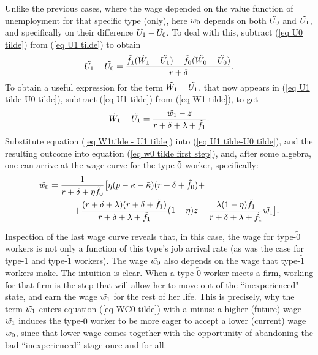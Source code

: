 \documentclass[12pt]{article} %
\theoremstyle{definition}
\begin{document}
Unlike the previous cases, where the wage depended on the value function of unemployment for that specific type (only), here $\Tilde{w_0}$ depends on both $\Tilde{U_0}$ {and} $\Tilde{U_1}$, and specifically on their difference $\Tilde{U_1}-\Tilde{U_0}$. To deal with this, subtract (\ref{eq U0 tilde}) from (\ref{eq U1 tilde}) to obtain 
\begin{equation}
\Tilde{U_1}-\Tilde{U_0} = \frac{\Tilde{f_1}(\Tilde{W_1}-\Tilde{U_1}) - \Tilde{f_0}(\Tilde{W_0}-\Tilde{U_0})}{r+\delta}.\label{eq U1 tilde-U0 tilde}
    \end{equation}To obtain a useful expression for the term $\Tilde{W_1}-\Tilde{U_1}$, that now appears in (\ref{eq U1 tilde-U0 tilde}), subtract (\ref{eq U1 tilde}) from (\ref{eq W1 tilde}), to get  
\begin{equation}
\Tilde{W_1}-\Tilde{U_1} = \frac{\Tilde{w_1}-z}{r+\delta+\lambda+\Tilde{f_1}}. \label{eq W1tilde - U1 tilde}
\end{equation} Substitute equation (\ref{eq W1tilde - U1 tilde}) into (\ref{eq U1 tilde-U0 tilde}), and the resulting outcome into equation (\ref{eq w0 tilde first step}), and, after some algebra, one can arrive at the wage curve for the type-$\Tilde{0}$ worker, specifically: 
\begin{equation} 
\begin{split}
\Tilde{w_0} = \frac{1}{r+\delta+\eta \Tilde{f_0}}\big[\eta(p-\kappa-\Tilde{\kappa})(r+\delta+ \Tilde{f_0}) &+ \\
+\frac{(r+\delta+\lambda)(r+\delta+\Tilde{f_1})}{r+\delta+\lambda+\Tilde{f_1}}(1-\eta)z &- \frac{\lambda(1-\eta)\Tilde{f_1}}{r+\delta+\lambda+\Tilde{f_1}}\Tilde{w_1} \big]. \label{eq WC0 tilde}
\end{split}
\end{equation}

Inspection of the last wage curve reveals that, in this case, the wage for type-$\tilde{0}$ workers is not only a function of this type's job arrival rate (as was the case for type-1 and type-$\tilde{1}$ workers). The wage $\Tilde{w_0}$ also depends on the wage that type-$\tilde{1}$ workers make. The intuition is clear. When a type-$\tilde{0}$ worker meets a firm, working for that firm is the step that will allow her to move out of the ``inexperienced" state, and earn the wage $\Tilde{w_1}$ for the rest of her life. This is precisely, why the term $\Tilde{w_1}$ enters equation (\ref{eq WC0 tilde}) with a minus: a higher (future) wage $\Tilde{w_1}$ induces the type-$\tilde{0}$ worker to be more eager to accept a lower (current) wage $\Tilde{w_0}$, since that lower wage comes together with the opportunity of abandoning the bad ``inexperienced'' stage once and for all. 
\end{document}
